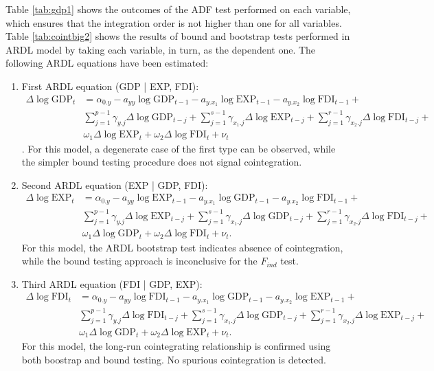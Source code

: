 \noindent Table \ref{tab:gdp1} shows the outcomes of the ADF test performed on each variable, which ensures that the integration order is not higher than one for all variables. Table \ref{tab:cointbig2} shows the results of bound and bootstrap tests performed in ARDL model by taking each variable, in turn, as the dependent one.
The following ARDL equations have been estimated:
\begin{enumerate}[I]
    \item First ARDL equation (GDP | EXP, FDI):
    \begin{align}
    \Delta \log \text{GDP}_{t}&=\alpha_{0.y} -
    a_{yy} \log \text{GDP}_{t-1} - {a}_{y.x_1}\log \text{EXP}_{t-1} - {a}_{y.x_2}\log \text{FDI}_{t-1} +\\\nonumber
    &\sum_{j=1}^{p-1}\gamma_{y.j} \Delta\log \text{GDP}_{t-j} +
    \sum_{j=1}^{s-1}\gamma_{x_1.j} \Delta\log \text{EXP}_{t-j} +
    \sum_{j=1}^{r-1}\gamma_{x_2.j} \Delta\log \text{FDI}_{t-j} +\\\nonumber
    &\omega_1 \Delta\log \text{EXP}_{t}+
    \omega_2 \Delta\log \text{FDI}_{t}+\nu_{t} 
    \end{align}.
    For this model, a degenerate case of the first type can be observed, while the simpler bound testing procedure does not signal cointegration.
    \item Second ARDL equation (EXP | GDP, FDI):
    \begin{align}
    \Delta \log \text{EXP}_{t}&=\alpha_{0.y} -
    a_{yy} \log \text{EXP}_{t-1} - {a}_{y.x_1}\log \text{GDP}_{t-1} - {a}_{y.x_2}\log \text{FDI}_{t-1} +\\\nonumber
    &\sum_{j=1}^{p-1}\gamma_{y.j} \Delta\log \text{EXP}_{t-j} +
    \sum_{j=1}^{s-1}\gamma_{x_1.j} \Delta\log \text{GDP}_{t-j} +
    \sum_{j=1}^{r-1}\gamma_{x_2.j} \Delta\log \text{FDI}_{t-j} +\\\nonumber
    &\omega_1 \Delta\log \text{GDP}_{t}+
    \omega_2 \Delta\log \text{FDI}_{t}+\nu_{t}. 
    \end{align}
  For this model, the ARDL bootstrap test indicates absence of cointegration, while the bound testing approach is inconclusive for the $F_{ind}$ test.
      \item Third ARDL equation (FDI | GDP, EXP):
    \begin{align}
    \Delta \log \text{FDI}_{t}&=\alpha_{0.y} -
    a_{yy} \log \text{FDI}_{t-1} - {a}_{y.x_1}\log \text{GDP}_{t-1} - {a}_{y.x_2}\log \text{EXP}_{t-1} +\\\nonumber
    &\sum_{j=1}^{p-1}\gamma_{y.j} \Delta\log \text{FDI}_{t-j} +
    \sum_{j=1}^{s-1}\gamma_{x_1.j} \Delta\log \text{GDP}_{t-j} +
    \sum_{j=1}^{r-1}\gamma_{x_2.j} \Delta\log \text{EXP}_{t-j} +\\\nonumber
    &\omega_1 \Delta\log \text{GDP}_{t}+
    \omega_2 \Delta\log \text{EXP}_{t}+\nu_{t}. 
    \end{align}
        For this model, the long-run cointegrating relationship is confirmed using both boostrap and bound testing. No spurious cointegration is detected.
\end{enumerate}
